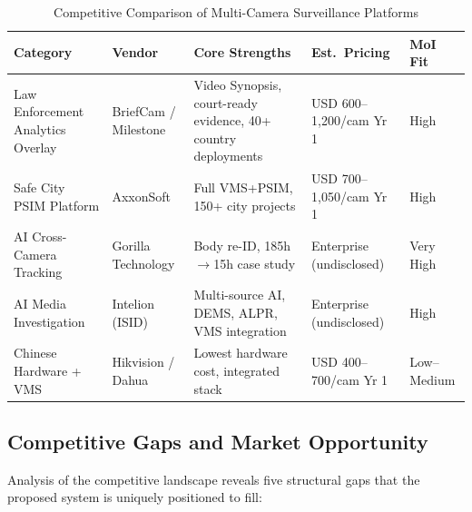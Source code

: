 \begin{table}[htbp]
\centering
\caption{Competitive Comparison of Multi-Camera Surveillance Platforms}
\label{tab:competitive-comparison}
\begin{tabular}{|p{3cm}|p{3cm}|p{4cm}|p{2.5cm}|p{2cm}|}
\hline
\textbf{Category} & \textbf{Vendor} & \textbf{Core Strengths} & \textbf{Est.\ Pricing} & \textbf{MoI Fit} \\
\hline
Law Enforcement Analytics Overlay & BriefCam / Milestone & Video Synopsis, court-ready evidence, 40+ country deployments \cite{briefcam_policing,milestone_briefcam} & USD 600--1,200/cam Yr 1 & High \\
\hline
Safe City PSIM Platform & AxxonSoft & Full VMS+PSIM, 150+ city projects \cite{axxonsoft_website} & USD 700--1,050/cam Yr 1 & High \\
\hline
AI Cross-Camera Tracking & Gorilla Technology & Body re-ID, 185h$\rightarrow$15h case study \cite{gorilla_law_enforcement,gorilla_faster_video} & Enterprise (undisclosed) & Very High \\
\hline
AI Media Investigation & Intelion (ISID) & Multi-source AI, DEMS, ALPR, VMS integration \cite{intelion_tecnosec,intelion_dems} & Enterprise (undisclosed) & High \\
\hline
Chinese Hardware + VMS & Hikvision / Dahua & Lowest hardware cost, integrated stack \cite{mordorintelligence_cctv} & USD 400--700/cam Yr 1 & Low--Medium \\
\hline
\end{tabular}
\end{table}

\subsection{Competitive Gaps and Market Opportunity}

Analysis of the competitive landscape reveals five structural gaps that the proposed system is uniquely positioned to fill:


